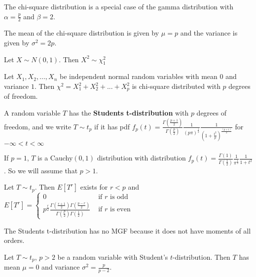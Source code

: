 The chi-square distribution is a special case of the gamma distribution with $\alpha = \frac{p}{2}$ and $\beta = 2$.

\begin{prop}
The mean of the chi-square distribution is given by $\mu = p$ and the variance is given by $\sigma^2 = 2p$.
\end{prop}

\begin{prop}
Let $X \sim N(0,1)$. Then $X^2 \sim \chi_1^2$
\end{prop}

\begin{prop}
    Let $X_1, X_2, ..., X_n$ be independent normal random variables with mean $0$ and variance $1$. Then $\chi^2 = X_1^2 + X_2^2 + ... + X_p^2$ is chi-square distributed with $p$ degrees of freedom.
\end{prop}

\begin{defn}
    A random variable $T$ has the \textbf{Students t-distribution} with $p$ degrees of freedom, and we write $T \sim t_p$ if it has pdf $f_p (t) = \displaystyle \frac{\Gamma(\frac{p+1}{2})}{\Gamma(\frac{p}{2})} \frac{1}{(p \pi)^{\frac{1}{2}}} \frac{1}{(1 + \frac{t^2}{p})^{\frac{(p+1)}{2}}} $ for $- \infty < t < \infty$
\end{defn}

\begin{prop}
    If $p=1$, $T$ is a Cauchy$(0,1)$ distribution with distribution $f_p(t) = \displaystyle\frac{\Gamma(1)}{\Gamma(\frac{1}{2})} \frac{1}{\pi^\frac{1}{2}} \frac{1}{1+t^2}$. So we will assume that $p > 1$.
\end{prop}

\begin{prop}
    Let $T \sim t_p$. Then $E[T^r]$ exists for $r < p$ and \\ $E[T^r] = \begin{cases} 0 & \text{ if } r \text{ is odd } \\   \displaystyle p^{\frac{r}{2}} \frac{\Gamma(\frac{r+1}{2})\Gamma(\frac{p-r}{2})}{\Gamma(\frac{p}{2})\Gamma(\frac{1}{2})} & \text{ if } r \text{ is even }\end{cases}$
\end{prop}

\begin{prop}
    The Students t-distribution has no MGF because it does not have moments of all orders.
\end{prop}

\begin{prop}
    Let $T \sim t_p$, $p > 2$ be a random variable with Student's $t$-distribution. Then $T$ has mean $\mu = 0$ and variance $\sigma^2 = \displaystyle \frac{p}{p-2}$.
\end{prop}

